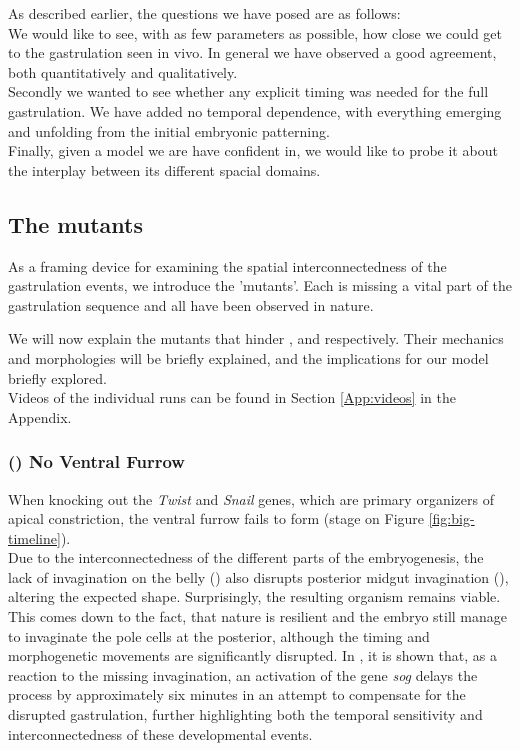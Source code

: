 As described earlier, the questions we have posed are as follows:\\

We would like to see, with as few parameters as possible, how close we could get to the gastrulation seen in vivo. In general we have observed a good agreement, both quantitatively and qualitatively.\\ Secondly we wanted to see whether any explicit timing was needed for the full gastrulation. We have added no temporal dependence, with everything emerging and unfolding from the initial embryonic patterning. \\ 
Finally, given a model we are have confident in, we would like to probe it about the interplay between its different spacial domains. 

\subsection{The mutants}
As a framing device for examining the spatial interconnectedness of the gastrulation events, we introduce the 'mutants'. Each is missing a vital part of the gastrulation sequence and all have been observed in nature.

We will now explain the mutants that hinder ,  and  respectively. Their mechanics and morphologies will be briefly explained, and the implications for our model briefly explored. \\
Videos of the individual runs can be found in Section \ref{App:videos} in the Appendix.

\subsubsection{() No Ventral Furrow }
When knocking out the \textit{Twist} and \textit{Snail} genes, which are primary organizers of apical constriction, the ventral furrow fails to form (stage  on Figure \ref{fig:big-timeline}).\cite{leptin1991twist} \\

Due to the interconnectedness of the different parts of the embryogenesis, the lack of invagination on the belly () also disrupts posterior midgut invagination (), altering the expected shape. Surprisingly, the resulting organism remains viable.\cite{conte2012biomechanical} This comes down to the fact, that nature is resilient and the embryo still manage to invaginate the pole cells at the posterior, although the timing and morphogenetic movements are significantly disrupted. In , it is shown that, as a reaction to the missing invagination, an activation of the gene \textit{sog} delays the process by approximately six minutes in an attempt to compensate for the disrupted gastrulation, further highlighting both the temporal sensitivity and interconnectedness of these developmental events.\\


